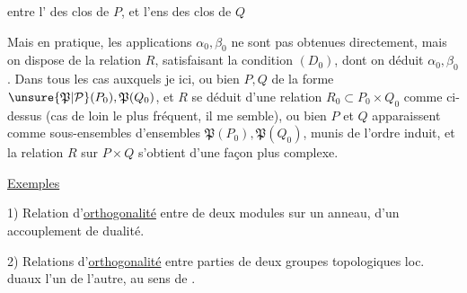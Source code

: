 
entre l' des  clos de $P$, et l'ens des  clos de $Q$


Mais en pratique, les applications $\alpha_0,\beta_0$ ne sont pas obtenues directement, mais on dispose de la relation $R$, satisfaisant la condition $(D_0)$, dont on déduit $\alpha_0,\beta_0$. Dans tous les cas auxquels je   ici, ou bien $P,Q$  de la forme $\unsure{\mathfrak P|\mathcal P}(P_0),\mathfrak P(Q_0)$, et $R$ se déduit d'une relation $R_0\subset P_0\times Q_0$ comme ci-dessus (cas de loin le plus fréquent, il me semble), ou bien $P$ et $Q$ apparaissent comme sous-ensembles  d'ensembles $\mathfrak P(P_0),\mathfrak P(Q_0)$, munis de l'ordre induit, et la relation $R$ sur $P\times Q$ s'obtient d'une façon plus complexe.

\uline{Exemples}

1) Relation d'\uline{orthogonalité} entre  de deux modules sur un anneau,  d'un accouplement de dualité. 


2) Relations d'\uline{orthogonalité} entre parties de deux groupes topologiques  loc.  duaux l'un de l'autre, au sens de .
